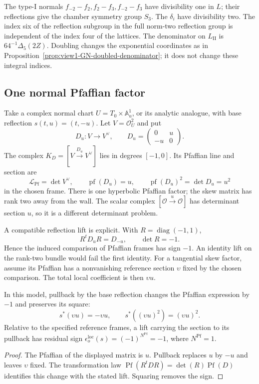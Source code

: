 The type-I normals
\(f_{-2}-f_2,f_2-f_3,f_{-2}-f_3\) have divisibility one in
\(L\); their reflections give the chamber symmetry group \(S_3\).
The \(\delta_i\) have divisibility two. The index six of the
reflection subgroup in the full norm-two reflection group is
independent of the index four of the lattices.
The denominator on \(L_{\mathrm{II}}\) is
\(64^{-1}\Delta_5(2Z)\). Doubling changes the exponential
coordinates as in Proposition~\ref{prop:view1-GN-doubled-denominator};
it does not change these integral indices.

\subsection{One normal Pfaffian factor}
\label{app:pfaffian-wall-rank-one}
\label{app:pfaffian-wall-sign-computation}

Take a complex normal chart \(U=T_0\times\mathbb A^1_u\), or its
analytic analogue, with base reflection \(s(t,u)=(t,-u)\).
Let \(V=\mathcal O_U^2\) and put
\[
 D_u:V\longrightarrow V^\vee,
 \qquad D_u=\begin{pmatrix}0&u\\-u&0\end{pmatrix}.
\]
The complex \(K_D=[V\xrightarrow{D_u}V^\vee]\) lies in degrees
\([-1,0]\). Its Pfaffian line and section are
\[
 \mathscr L_{\mathrm{Pf}}=\det V^\vee,
 \qquad \operatorname{pf}(D_u)=u,
 \qquad \operatorname{pf}(D_u)^2=\det D_u=u^2
\]
in the chosen frame. There is one hyperbolic Pfaffian factor;
the skew matrix has rank two away from the wall. The scalar complex
\([\mathcal O\xrightarrow{u}\mathcal O]\) has determinant section
\(u\), so it is a different determinant problem.

A compatible reflection lift is explicit. With
\(R=\operatorname{diag}(-1,1)\),
\[
 R^tD_uR=D_{-u},\qquad \det R=-1.
\]
Hence the induced comparison of Pfaffian frames has sign \(-1\).
An identity lift on the rank-two bundle would fail the first
identity. For a tangential skew factor, assume its Pfaffian has a
nonvanishing reference section \(\upsilon\) fixed by the chosen
comparison. The total local coefficient is then \(\upsilon u\).

\begin{proposition}
\label{prop:appE-local-pfaffian-sign}
In this model, pullback by the base reflection changes the
Pfaffian expression by \(-1\) and preserves its square:
\[
 s^*(\upsilon u)=-\upsilon u,
 \qquad s^*((\upsilon u)^2)=(\upsilon u)^2.
\]
Relative to the specified reference frames, a lift carrying the
section to its pullback has residual sign
\(\epsilon_o^{\mathrm{loc}}(s)=(-1)^{N^{\mathrm{Pf}}}=-1\), where
\(N^{\mathrm{Pf}}=1\).
\end{proposition}
\begin{proof}
The Pfaffian of the displayed matrix is \(u\). Pullback replaces
\(u\) by \(-u\) and leaves \(\upsilon\) fixed. The transformation
law \(\operatorname{Pf}(R^tDR)=\det(R)\operatorname{Pf}(D)\)
identifies this change with the stated lift. Squaring removes the
sign.
\end{proof}

